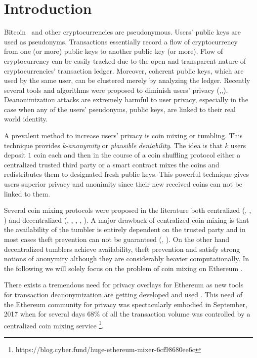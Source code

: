 \documentclass[conference, compsoc]{IEEEtran}
\theoremstyle{definition}
\begin{document}
\section{Introduction}
Bitcoin~\cite{nakamoto2008bitcoin} and other cryptocurrencies are pseudonymous. Users' public keys are used as pseudonyms. Transactions essentially record a flow of cryptocurrency from one (or more) public keys to another public key (or more). Flow of cryptocurrency can be easily tracked due to the open and transparent nature of cryptocurrencies' transaction ledger. Moreover, coherent public keys, which are used by the same user, can be clustered merely by analyzing the ledger. Recently several tools and algorithms were proposed to diminish users' privacy (\cite{meiklejohn2013fistful},\cite{moser2013inquiry},\cite{moreno2016listening}). Deanonimization attacks are extremely harmful to user privacy, especially in the case when any of the users' pseudonyms, public keys, are linked to their real world identity.

A prevalent method to increase users' privacy is coin mixing or tumbling. This technique provides \textit{k-anonymity} or \textit{plausible deniability}. The idea is that $k$ users deposit $1$ coin each and then in the course of a coin shuffling protocol either a centralized trusted third party or a smart contract mixes the coins and redistributes them to designated fresh public keys. This powerful technique gives users superior privacy and anonimity since their new received coins can not be linked to them.

Several coin mixing protocols were proposed in the literature both centralized (\cite{bonneau2014mixcoin}, \cite{valenta2015blindcoin}, \cite{heilman2017tumblebit}) and decentralized (\cite{maxwell2013coinjoin}, \cite{ruffing2014coinshuffle}, \cite{miximus2018}, \cite{meiklejohn2018mobius}, \cite{bissias2014sybil}). A major drawback of centralized coin mixing is that the availability of the tumbler is entirely dependent on the trusted party and in most cases theft prevention can not be guaranteed (\cite{bonneau2014mixcoin}, \cite{valenta2015blindcoin}). On the other hand decentralized tumblers achieve availability, theft prevention and satisfy strong notions of anonymity although they are considerably heavier computationally. In the following we will solely focus on the problem of coin mixing on Ethereum \cite{wood2014ethereum}. 

There exists a tremendous need for privacy overlays for Ethereum as new tools for transaction deanonymization are getting developed and used \cite{chan2017ethereum}. This need of the Ethereum community for privacy was spectacularly embodied in September, 2017 when for several days $68\%$ of all the transaction volume was controlled by a centralized coin mixing service \footnote{https://blog.cyber.fund/huge-ethereum-mixer-6cf98680ee6c}.
\end{document}
